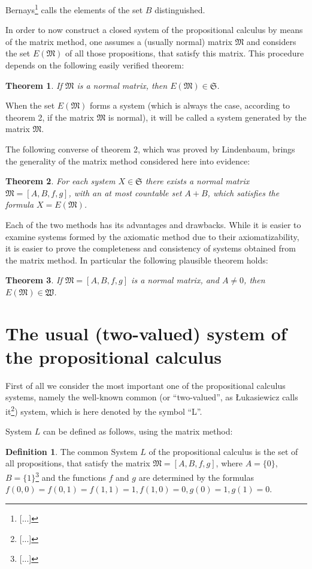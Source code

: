\documentclass{article}
\newtheorem{theorem}{Theorem}
\theoremstyle{definition}
\newtheorem{definition}{Definition}
\begin{document}
Bernays\footnote{[...]} calls the elements of the set $B$ distinguished.

In order to now construct a closed system of the propositional calculus by means of the matrix method, one assumes a (usually normal) matrix $\mathfrak{M}$ and considers the set $E(\mathfrak{M})$ of all those propositions, that satisfy this matrix. This procedure depends on the following easily verified theorem:
\begin{theorem}
  If $\mathfrak{M}$ is a normal matrix, then $E(\mathfrak{M})\in\mathfrak{S}$.
\end{theorem}

When the set $E(\mathfrak{M})$ forms a system (which is always the case, according to theorem 2, if the matrix $\mathfrak{M}$ is normal), it will be called a system generated by the matrix $\mathfrak{M}$.

The following converse of theorem 2, which was proved by Lindenbaum, brings the generality of the matrix method considered here into evidence:
\begin{theorem}
  For each system $X\in\mathfrak{S}$ there exists a normal matrix $\mathfrak{M}=[A,B,f,g]$, with an at most countable set $A+B$, which satisfies the formula $X=E(\mathfrak{M})$.
\end{theorem}

Each of the two methods has its advantages and drawbacks. While it is easier to examine systems formed by the axiomatic method due to their axiomatizability, it is easier to prove the completeness and consistency of systems obtained from the matrix method. In particular the following plausible theorem holds:
\begin{theorem}
  If $\mathfrak{M}=[A,B,f,g]$ is a normal matrix, and $A\not=0$, then $E(\mathfrak{M})\in\mathfrak{W}$.
\end{theorem}

\section{The usual (two-valued) system of the propositional calculus}
First of all we consider the most important one of the propositional calculus systems, namely the well-known common (or ``two-valued'', as Łukasiewicz calls it\footnote{[...]}) system, which is here denoted by the symbol ``L''.

System $L$ can be defined as follows, using the matrix method:
\begin{definition}
  The common System $L$ of the propositional calculus is the set of all propositions, that satisfy the matrix $\mathfrak{M}=[A,B,f,g]$, where $A=\{0\}$, $B=\{1\}$\footnote{[...]} and the functions $f$ and $g$ are determined by the formulas $f(0,0)=f(0,1)=f(1,1)=1,f(1,0)=0,g(0)=1,g(1)=0$.
\end{definition}
\end{document}

